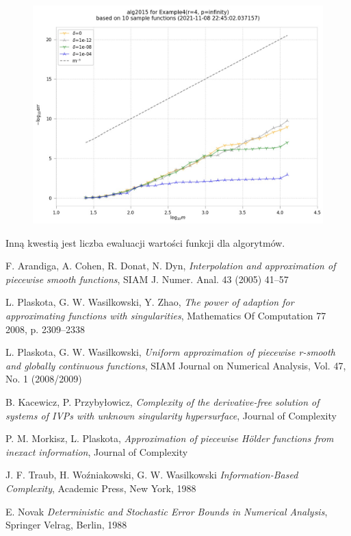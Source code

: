 \documentclass[oik, pdftex, man]{mgrwms}
\begin{document}
    \begin{figure}[h!]
        \includegraphics[width=.9\linewidth]{Ex4/algMPpInfr4.jpg}
    \end{figure}

    
    Inną kwestią jest liczba ewaluacji wartości funkcji dla algorytmów.


\mgrclosechapter



%  
\begin{thebibliography}{88}

    F. Arandiga, A. Cohen, R. Donat, N. Dyn,
    \emph{Interpolation and approximation of piecewise smooth functions}, SIAM J. Numer. Anal. 43 (2005) 41–57

    L. Plaskota, G. W. Wasilkowski, Y. Zhao, 
    \emph{The power of adaption for approximating functions with singularities}, Mathematics Of Computation 77
    2008, p. 2309–2338

    L. Plaskota, G. W. Wasilkowski, 
    \emph{Uniform approximation of piecewise r-smooth and globally continuous functions}, SIAM Journal on Numerical
    Analysis, Vol. 47, No. 1 (2008/2009)

    B. Kacewicz, P. Przybyłowicz, 
    \emph{Complexity of the derivative-free solution of
    systems of IVPs with unknown singularity hypersurface}, Journal of Complexity
    
    P. M. Morkisz, L. Plaskota, 
    \emph{Approximation of piecewise Hölder functions from inexact information}, Journal of Complexity

    J. F. Traub, H. Woźniakowski, G. W. Wasilkowski
    \emph{Information-Based Complexity}, Academic Press, New York, 1988

    E. Novak
    \emph{Deterministic and Stochastic Error Bounds in Numerical Analysis}, Springer Velrag, Berlin, 1988

\end{thebibliography}
\end{document}
